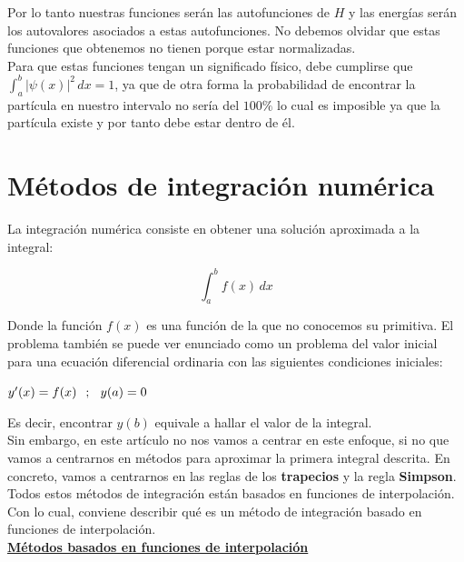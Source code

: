 \documentclass[12pt]{article}
\begin{document}
Por lo tanto nuestras funciones serán las autofunciones de $H$ y las energías serán los autovalores asociados a estas autofunciones. No debemos olvidar que estas funciones que obtenemos no tienen porque estar normalizadas.\\

Para que estas funciones tengan un significado físico, debe cumplirse que $\int_{a}^{b}  |\psi(x)|^2\,dx =1$, ya que de otra forma la probabilidad de encontrar la partícula en nuestro intervalo no sería del $100\%$ lo cual es imposible ya que la partícula existe y por tanto debe estar dentro de él.
\newpage

\section{Métodos de integración numérica}

La integración numérica consiste en obtener una solución aproximada a la integral:

\begin{equation}
\int_{a}^{b} f(x) \,dx 
\end{equation}

Donde la función $f(x)$ es una función de la que no conocemos su primitiva.
El problema también se puede ver enunciado como un problema del valor inicial 
para una ecuación diferencial ordinaria con las siguientes condiciones iniciales:

\begin{center}
$y'(x)=f(x) \hspace{2.5mm} ; \hspace{2.5mm} y(a)=0$\\
\end{center}

Es decir, encontrar $y(b)$ equivale a hallar el valor de la integral. \\

Sin embargo, en este artículo no nos vamos a centrar en este enfoque, si no que vamos a centrarnos en métodos para aproximar la primera integral descrita.
En concreto, vamos a centrarnos en las reglas de los \textbf{trapecios} y la regla \textbf{Simpson}. \\

Todos estos métodos de integración están basados en funciones de interpolación.
Con lo cual, conviene describir qué es un método de integración basado en funciones de interpolación.\\

\underline{\textbf{Métodos basados en funciones de interpolación}} \\
\end{document}
